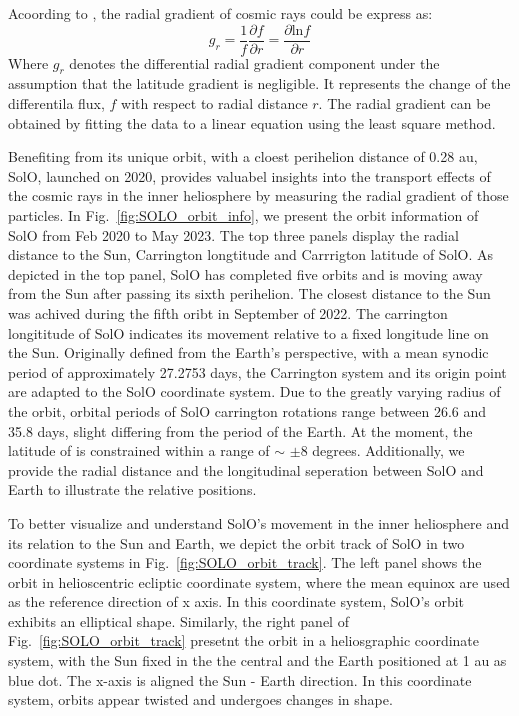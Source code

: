 Acoording to \citet{Rankin2021ApJ}, the radial gradient of cosmic rays could be express as:
\begin{equation}
    g_r = \frac{1}{f}\frac{\partial{f}}{\partial{r}} = \frac{\partial{\mathrm{ln} f}}{\partial{r}}
    \label{eq:radial_gradient}
\end{equation}
Where $g_r$ denotes the differential radial gradient component under the assumption that the latitude gradient is negligible. It represents the change of the differentila flux, $f$ with respect to radial distance $r$. The radial gradient can be obtained by fitting the data to a linear equation using the least square method.


Benefiting from its unique orbit, with a cloest perihelion distance of 0.28 au, \ac{SolO}, launched on 2020, provides valuabel insights into the transport effects of the cosmic rays in the inner heliosphere by measuring the radial gradient of those particles.
In Fig.~\ref{fig:SOLO_orbit_info}, we present the orbit information of \ac{SolO} from Feb 2020 to May 2023. The top three panels display the radial distance to the Sun, Carrington longtitude and Carrrigton latitude of \ac{SolO}. As depicted in the top panel, \ac{SolO} has completed five orbits and is moving away from the Sun after passing its sixth perihelion. The closest distance to the Sun was achived during the fifth oribt in September of 2022. 
The carrington longititude of \ac{SolO} indicates its movement relative to a fixed longitude line on the Sun. Originally defined from the Earth's perspective, with a mean synodic period of approximately 27.2753 days, the Carrington system and its origin point are adapted to the \ac{SolO} coordinate system. 
Due to the greatly varying radius of the orbit, orbital periods of \ac{SolO} carrington rotations range between 26.6 and 35.8 days, slight differing from the period of the Earth. At the moment, the latitude of  is constrained within a range of $\sim$ $\pm$8 degrees.
Additionally, we provide the radial distance and the longitudinal seperation between \ac{SolO} and Earth to illustrate the relative positions.

To better visualize and understand \ac{SolO}'s movement in the inner heliosphere and its relation to the Sun and Earth, we depict the orbit track of \ac{SolO} in two coordinate systems in Fig.~\ref{fig:SOLO_orbit_track}. The left panel shows the orbit in helioscentric ecliptic coordinate system, where the mean equinox are used as the reference direction of x axis. In this coordinate system, \ac{SolO}'s orbit exhibits an elliptical shape. Similarly, the right panel of Fig.~\ref{fig:SOLO_orbit_track} presetnt the orbit in a heliosgraphic coordinate system, with the Sun fixed in the the central and the Earth positioned at 1 au as blue dot. The x-axis is aligned the Sun - Earth direction. In this coordinate system, orbits appear twisted and undergoes changes in shape.


